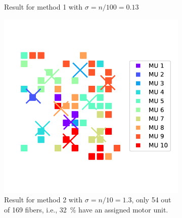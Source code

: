 \begin{figure}
\begin{subfigure}[t]{0.48\textwidth}
    \caption{Result for method 1 with $\sigma = n/100 = 0.13$}%
    \label{fig:MU_fibre_distribution_13x13_10_2d_fiber_distribution_sigma}%
  \end{subfigure}
  \begin{subfigure}[t]{0.48\textwidth}%
    \centering%
    \includegraphics[width=\textwidth]{images/motor_unit_assignment/MU_fibre_distribution_sparse_13x13_10_2d_fiber_distribution.pdf}%
    \caption{Result for method 2 with $\sigma = n/10 = 1.3$, only 54 out of 169 fibers, i.e., \SI{32}{\percent} have an assigned motor unit.}%
    \label{fig:MU_fibre_distribution_sparse_13x13_10_2d_fiber_distribution}%
  \end{subfigure}
  \quad
  \begin{subfigure}[t]{0.48\textwidth}%
    \centering%

\end{subfigure}
\end{figure}
